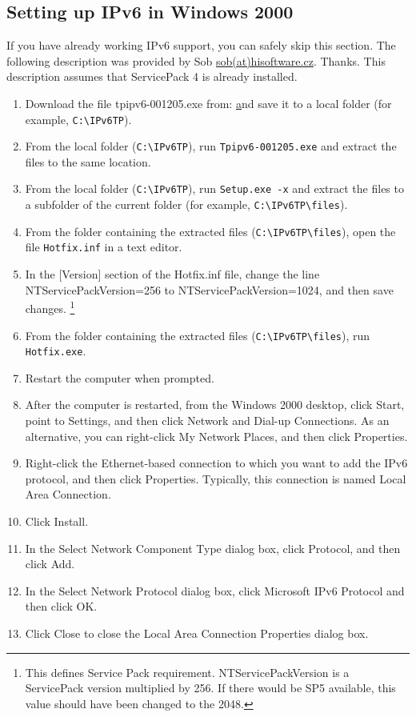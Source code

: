 \subsection{Setting up IPv6 in Windows 2000}
If you have already working IPv6 support, you can safely skip this
section. The following description was provided by Sob 
\href{mailto:sob(at)hisoftware.cz}{sob(at)hisoftware.cz}. Thanks. This
description assumes that ServicePack 4 is already installed.

\begin{enumerate}
  \item Download the file tpipv6-001205.exe from:
    \href{http://msdn.microsoft.com/downloads/sdks/platform/tpipv6.asp}
    and save it to a local folder (for example, \verb+C:\IPv6TP+).
  \item From the local folder (\verb+C:\IPv6TP+), run \verb+Tpipv6-001205.exe+ and extract the
    files to the same location.
  \item From the local folder (\verb+C:\IPv6TP+), run \verb+Setup.exe -x+ and extract the files to
    a subfolder of the current folder (for example, \verb+C:\IPv6TP\files+).
  \item From the folder containing the extracted files (\verb+C:\IPv6TP\files+), open the
    file \verb+Hotfix.inf+ in a text editor.
  \item In the [Version] section of the Hotfix.inf file, change the line
    NTServicePackVersion=256 to NTServicePackVersion=1024, and then
    save changes. \footnote{This defines Service Pack requirement.
      NTServicePackVersion is a ServicePack version multiplied by 256. If there
    would be SP5 available, this value should have been changed to the 2048.}
  \item From the folder containing the extracted files (\verb+C:\IPv6TP\files+), run
    \verb+Hotfix.exe+.
  \item Restart the computer when prompted.
  \item After the computer is restarted, from the Windows 2000 desktop, click Start,
    point to Settings, and then click Network and Dial-up Connections. As an
    alternative, you can right-click My Network Places, and then click Properties.
  \item Right-click the Ethernet-based connection to which you want to add the IPv6
    protocol, and then click Properties. Typically, this connection is named
    Local Area Connection.
  \item Click Install.
  \item In the Select Network Component Type dialog box, click Protocol, and then
    click Add.
  \item In the Select Network Protocol dialog box, click Microsoft IPv6 Protocol and
    then click OK.
  \item Click Close to close the Local Area Connection Properties
    dialog box.
\end{enumerate}

